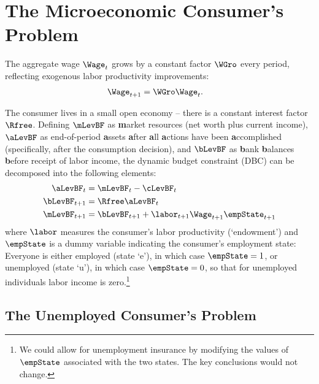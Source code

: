 \documentclass{\handout}
\begin{document}

\section{The Microeconomic Consumer's Problem}
The aggregate wage $\Wage_{t}$ grows by a constant factor $\WGro$ every period, reflecting exogenous labor productivity improvements:
\begin{equation}\begin{gathered}\begin{aligned}
        \Wage_{t+1} & =  \WGro \Wage_{t}.
\end{aligned}\end{gathered}\end{equation}


The consumer lives in a small open economy -- there is a constant interest factor $\Rfree$.  Defining $\mLevBF$ as {\bf m}arket resources (net worth plus current income), $\aLevBF$ as end-of-period {\bf a}ssets {\bf a}fter {\bf a}ll {\bf a}ctions have been {\bf a}ccomplished (specifically, after the consumption decision), and $\bLevBF$ as {\bf b}ank {\bf b}alances {\bf b}efore receipt of labor income, the dynamic budget constraint (DBC) can be decomposed into the following elements:
\begin{equation}\begin{gathered}\begin{aligned}
    \aLevBF_{t} & =  \mLevBF_{t}-\cLevBF_{t}
\\  \bLevBF_{t+1} & =  \Rfree \aLevBF_{t}
\\  \mLevBF_{t+1} & =  \bLevBF_{t+1}+\labor_{t+1}\Wage_{t+1}\empState_{t+1}  \label{eq:DBC}
\end{aligned}\end{gathered}\end{equation}
where $\labor$ measures the consumer's labor productivity
(`endowment') and $\empState$ is a dummy variable indicating the
consumer's employment state: Everyone is either
employed (state `e'), in which case $\empState = 1$, or unemployed
(state `u'), in which case $\empState=0$, so that for unemployed
individuals labor income is zero.\footnote{We could allow for
  unemployment insurance by modifying the values of $\empState$
  associated with the two states.  The key conclusions would not
  change.}

\pagebreak 
\subsection{The Unemployed Consumer's Problem} \label{subsec:Fred}
\end{document}
